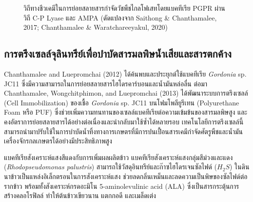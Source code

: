 \begin{figure}[H]
\caption{วิถีทางชีวเคมีในการย่อยสลายสารกำจัดวัชพืชไกลโฟเสทโดยแบคทีเรีย PGPR ผ่านวิถี C-P Lyase และ AMPA (ดัดแปลงจาก Saithong \& Chanthamalee, 2017; Chanthamalee \& Waratchareeyakul, 2020)}
\label{fig:glyphosate_biodegradation}
\end{figure}

\subsection{การตรึงเซลล์จุลินทรีย์เพื่อบำบัดสารมลพิษน้ำเสียและสารตกค้าง}
Chanthamalee and Luepromchai (2012) ได้ค้นพบและประยุกต์ใช้แบคทีเรีย \textit{Gordonia} sp. JC11 ซึ่งมีความสามารถในการย่อยสลายสารไฮโดรคาร์บอนและน้ำมันหล่อลื่น ต่อมา Chanthamalee, Wongchitphimon, and Luepromchai (2013) ได้พัฒนาระบบการตรึงเซลล์ (Cell Immobilization) ของเชื้อ \textit{Gordonia} sp. JC11 บนโฟมโพลียูรีเทน (Polyurethane Foam หรือ PUF) ซึ่งช่วยเพิ่มความทนทานของเซลล์แบคทีเรียต่อความเข้มข้นของสารมลพิษสูง และคงอัตราการย่อยสลายสารได้อย่างต่อเนื่องและนำกลับมาใช้ซ้ำได้หลายรอบ เทคโนโลยีการตรึงเซลล์นี้สามารถนำมาปรับใช้ในการบำบัดน้ำทิ้งทางการเกษตรที่มีการปนเปื้อนสารเคมีกำจัดศัตรูพืชและน้ำมันเครื่องจักรกลเกษตรได้อย่างมีประสิทธิภาพสูง

\begin{agribox}{แบคทีเรียสังเคราะห์แสงสีแดงกับการเพิ่มผลผลิตข้าว}
แบคทีเรียสังเคราะห์แสงกลุ่มสีม่วงและแดง (\textit{Rhodopseudomonas palustris}) สามารถใช้วัสดุอินทรีย์และก๊าซไฮโดรเจนซัลไฟด์ ($H_2S$) ในดินนาข้าวเป็นแหล่งอิเล็กตรอนในการสังเคราะห์แสง ช่วยลดกลิ่นเหม็นและลดความเป็นพิษของซัลไฟด์ต่อรากข้าว พร้อมทั้งสังเคราะห์กรดอะมิโน 5-aminolevulinic acid (ALA) ซึ่งเป็นสารกระตุ้นการสร้างคลอโรฟิลล์ ทำให้ต้นข้าวเขียวนาน แตกกอดี และเมล็ดเต่ง
\end{agribox}

